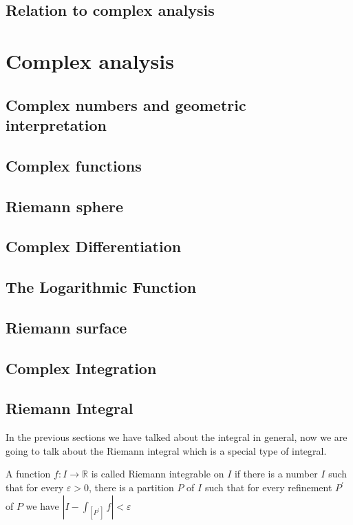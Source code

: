\documentclass{article}
\newcommand{\R}{\mathbb{R}}
\begin{document}
\subsection{Relation to complex analysis}



\section{Complex analysis}
\subsection{Complex numbers and geometric interpretation}
\subsection{Complex functions}
\subsection{Riemann sphere}
\subsection{Complex Differentiation}
\subsection{The Logarithmic Function}
\subsection{Riemann surface}
\subsection{Complex Integration}























\subsection{Riemann Integral}
In the previous sections we have talked about the integral in general, now we are going to talk about the Riemann integral which is a special type of integral. 
\begin{definition}
A function $f:I\to \R$ is called Riemann integrable on $I$ if there is a number $I$ such that for every $\varepsilon >0$,
there is a partition $P$ of $I$ such that for every refinement $P^{'}$ of $P$ we have $|I-\int_{[P^{'}]}f|<\varepsilon$ 

\end{definition}
\end{document}
